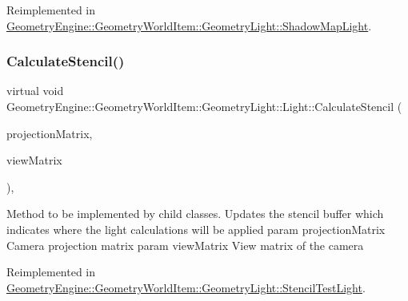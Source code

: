 Reimplemented in \mbox{\hyperlink{class_geometry_engine_1_1_geometry_world_item_1_1_geometry_light_1_1_shadow_map_light_a518efafd59e2dcd446140ae82140e172}{Geometry\+Engine\+::\+Geometry\+World\+Item\+::\+Geometry\+Light\+::\+Shadow\+Map\+Light}}.

\mbox{\label{class_geometry_engine_1_1_geometry_world_item_1_1_geometry_light_1_1_light_ae50fab4782158671041ac986dfead7fc}} 
\subsubsection{\texorpdfstring{CalculateStencil()}{CalculateStencil()}}
{\footnotesize\ttfamily virtual void Geometry\+Engine\+::\+Geometry\+World\+Item\+::\+Geometry\+Light\+::\+Light\+::\+Calculate\+Stencil (\begin{DoxyParamCaption}\item[{const Q\+Matrix4x4 \&}]{projection\+Matrix,  }\item[{const Q\+Matrix4x4 \&}]{view\+Matrix }\end{DoxyParamCaption})\hspace{0.3cm}{\ttfamily [inline]}, {\ttfamily [virtual]}}

Method to be implemented by child classes. Updates the stencil buffer which indicates where the light calculations will be applied param projection\+Matrix Camera projection matrix param view\+Matrix View matrix of the camera 

Reimplemented in \mbox{\hyperlink{class_geometry_engine_1_1_geometry_world_item_1_1_geometry_light_1_1_stencil_test_light_aa1d9d4bf4f47e6e55dbb1706a7e28697}{Geometry\+Engine\+::\+Geometry\+World\+Item\+::\+Geometry\+Light\+::\+Stencil\+Test\+Light}}.

\mbox{\label{class_geometry_engine_1_1_geometry_world_item_1_1_geometry_light_1_1_light_a53cc9a8e7ab6eab9d34f1655ef33eaef}} 
